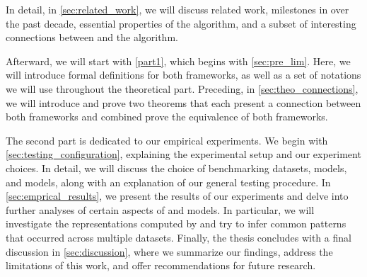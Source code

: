 In detail, in \cref{sec:related_work}, we will discuss related work, milestones in \gnns over the past decade, essential properties of the \wl algorithm, and a subset of interesting connections between \gnns and the \wl algorithm.

Afterward, we will start with \cref{part1}, which begins with \cref{sec:pre_lim}. Here, we will introduce formal definitions for both frameworks, as well as a set of notations we will use throughout the theoretical part. Preceding, in \cref{sec:theo_connections}, we will introduce and prove two theorems that each present a connection between both frameworks and combined prove the equivalence of both frameworks.

The second part is dedicated to our empirical experiments. We begin with \cref{sec:testing_configuration}, explaining the experimental setup and our experiment choices. In detail, we will discuss the choice of benchmarking datasets, \gnn models, and \wlnn models, along with an explanation of our general testing procedure. In \cref{sec:emprical_results}, we present the results of our experiments and delve into further analyses of certain aspects of \gnn and \wlnn models. In particular, we will investigate the representations computed by \gnns and try to infer common patterns that occurred across multiple datasets. Finally, the thesis concludes with a final discussion in \cref{sec:discussion}, where we summarize our findings, address the limitations of this work, and offer recommendations for future research.